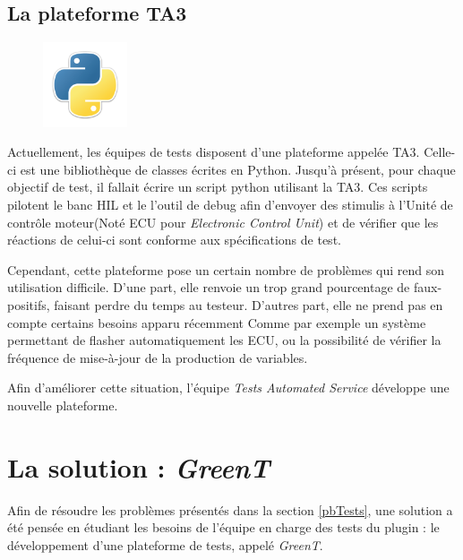 	\subsection{La plateforme TA3}\label{ta3}
\begin{figure}
	\includegraphics[width=2.5cm]{contents/images/python.png}
\end{figure}
	Actuellement, les équipes de tests disposent d'une plateforme appelée TA3. Celle-ci est une bibliothèque de classes écrites en Python. Jusqu'à présent, pour chaque objectif de test, il fallait écrire un script python utilisant la TA3. Ces scripts pilotent le banc HIL et le l'outil de debug afin d'envoyer des stimulis à l'Unité de contrôle moteur(Noté ECU pour \textit{Electronic Control Unit}) et de vérifier que les réactions de celui-ci sont conforme aux spécifications de test.

	Cependant, cette plateforme pose un certain nombre de problèmes qui rend son utilisation difficile. D'une part, elle renvoie un trop grand pourcentage de faux-positifs, faisant perdre du temps au testeur. D'autres part, elle ne prend pas en compte certains besoins apparu récemment Comme par exemple un système permettant de flasher automatiquement les ECU, ou la possibilité de vérifier la fréquence de mise-à-jour de la production de variables.

	Afin d'améliorer cette situation, l'équipe \textit{Tests Automated Service} développe une nouvelle plateforme.

	\section{La solution : \textit{GreenT}}
	Afin de résoudre les problèmes présentés dans la section \ref{pbTests}, une solution a été pensée en étudiant les besoins de l'équipe en charge des tests du plugin : le développement d'une plateforme de tests, appelé \textit{GreenT}.~\\

